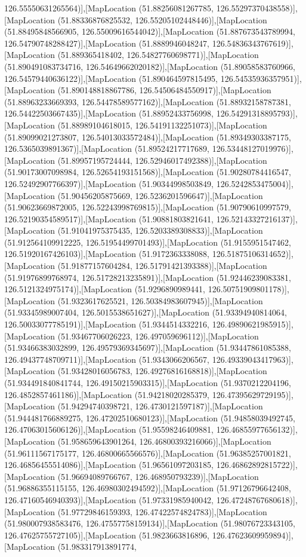 126.55550631265564)],[MapLocation (51.88256081267785, 126.55297370438558)],[MapLocation (51.88336876825532, 126.55205102448446)],[MapLocation (51.88495848566905, 126.55009616544042)],[MapLocation (51.887673543789994, 126.54790748288427)],[MapLocation (51.8889946048247, 126.54836343767619)],[MapLocation (51.889365418402, 126.54827760698771)],[MapLocation (51.890491083734716, 126.54649662020182)],[MapLocation (51.89058583760966, 126.54579440636122)],[MapLocation (51.890464597815495, 126.54535936357951)],[MapLocation (51.890148818867786, 126.54506484550917)],[MapLocation (51.88963233669393, 126.54478589577162)],[MapLocation (51.88932158787381, 126.54422503667435)],[MapLocation (51.88952433756998, 126.54291318895793)],[MapLocation (51.88989104618015, 126.54191132251073)],[MapLocation (51.89099021273807, 126.54013033572484)],[MapLocation (51.89349303387175, 126.5365039891367)],[MapLocation (51.89524217717689, 126.53448127019976)],[MapLocation (51.89957195724444, 126.52946017492388)],[MapLocation (51.90173007098984, 126.52654193151568)],[MapLocation (51.90280784416547, 126.52492907766397)],[MapLocation (51.90344998503849, 126.5242853475004)],[MapLocation (51.90456205875669, 126.5236201596647)],[MapLocation (51.90623669872005, 126.52243998769815)],[MapLocation (51.90790610997579, 126.52190354589517)],[MapLocation (51.90881803821641, 126.52143327216137)],[MapLocation (51.91041975375435, 126.5203389308833)],[MapLocation (51.912564109912225, 126.51954499701493)],[MapLocation (51.9155951547462, 126.51920167426103)],[MapLocation (51.9172363338088, 126.51875106314652)],[MapLocation (51.91877157604284, 126.51791421393388)],[MapLocation (51.91976899768974, 126.51728213235891)],[MapLocation (51.92446239083381, 126.5121324975174)],[MapLocation (51.9296890989441, 126.50751909801178)],[MapLocation (51.9323617625521, 126.50384983607945)],[MapLocation (51.93345989007404, 126.5015538651627)],[MapLocation (51.93394940814064, 126.50033077785191)],[MapLocation (51.9344514332216, 126.49890621985915)],[MapLocation (51.93467706026223, 126.497059696112)],[MapLocation (51.93466383032899, 126.49579369345697)],[MapLocation (51.93447861085388, 126.49437748709711)],[MapLocation (51.9343066206567, 126.49339043417963)],[MapLocation (51.93428016056783, 126.49276816168818)],[MapLocation (51.934491840841744, 126.49150215903315)],[MapLocation (51.9370212204196, 126.4852857461186)],[MapLocation (51.94218020285379, 126.47395629729195)],[MapLocation (51.94294740398721, 126.4730121597187)],[MapLocation (51.944481766889275, 126.47202510680123)],[MapLocation (51.94858039492745, 126.47063015606126)],[MapLocation (51.95598246409881, 126.46855977656132)],[MapLocation (51.958659643901264, 126.46800393216066)],[MapLocation (51.96111567175177, 126.46800665566576)],[MapLocation (51.96385257001821, 126.46856455514086)],[MapLocation (51.96561097203185, 126.46862892815722)],[MapLocation (51.96694089766767, 126.468950793239)],[MapLocation (51.96886355115155, 126.46980302494592)],[MapLocation (51.97126796642408, 126.47160546940393)],[MapLocation (51.97331985940042, 126.47248767680618)],[MapLocation (51.97729846159393, 126.47422574824783)],[MapLocation (51.980007938583476, 126.47557758159134)],[MapLocation (51.98076723343105, 126.47625755727105)],[MapLocation (51.9823663816896, 126.47623609959894)],[MapLocation (51.983317913891774, 